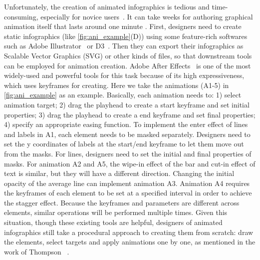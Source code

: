 Unfortunately, the creation of animated infographics is tedious and time-consuming, especially for novice users~\cite{amini2016authoring, hullman2013deeper, shi2021communicating}. %
It can take weeks for authoring graphical animation itself that lasts around one minute \cite{howlong}.
First, designers need to create static infographics (like \autoref{fig:ani_example}(D)) using some feature-rich softwares such as Adobe Illustrator~\cite{AdobeAI} or D3~\cite{bostock2011d3}.
Then they can export their infographics as Scalable Vector Graphics (SVG) or other kinds of files, so that downstream tools can be employed for animation creation.
Adobe After Effects~\cite{AdobeAE} is one of the most widely-used and powerful tools for this task because of its high expressiveness, which uses keyframes for creating.
Here we take the animations (A1-5) in \autoref{fig:ani_example} as an example.
Basically, each animation needs to: 
1) select animation target;
2) drag the playhead to create a start keyframe and set initial properties;
3) drag the playhead to create a end keyframe and set final properties;
4) specify an appropriate easing function.
To implement the enter effect of lines and labels in A1, each element needs to be masked separately.
Designers need to set the y coordinates of labels at the start/end keyframe to let them move out from the masks.
For lines, designers need to set the initial and final properties of masks.
For animation A2 and A5, the wipe-in effect of the bar and cut-in effect of text is similar, but they will have a different direction.
Changing the initial opacity of the average line can implement animation A3.
Animation A4 requires the keyframes of each element to be set at a specified interval in order to achieve the stagger effect.
Because the keyframes and parameters are different across elements, similar operations will be performed multiple times.
Given this situation, though these existing tools are helpful, designers of animated infographics still take a procedural approach to creating them from scratch: draw the elements, select targets and apply animations one by one, as mentioned in the work of Thompson \etal~\cite{thompson2020understanding}.

